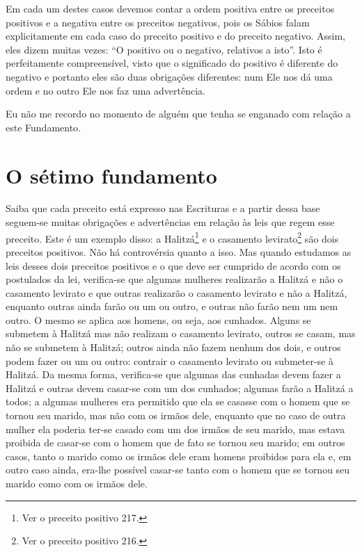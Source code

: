 Em cada um destes casos devemos contar a ordem positiva entre os
preceitos positivos e a negativa entre os preceitos negativos, pois os
Sábios falam explicitamente em cada caso do preceito positivo e do preceito
negativo. Assim, eles dizem muitas vezes: ``O positivo ou o negativo,
relativos a isto''. Isto é perfeitamente compreensível, visto que o
significado do positivo é diferente do negativo e portanto eles são
duas obrigações diferentes: num Ele nos dá uma ordem e no outro Ele nos
faz uma advertência.

Eu não me recordo no momento de alguém que tenha se enganado com relação
a este Fundamento.

\chapter*{O sétimo fundamento}

Saiba que cada preceito está expresso nas Escrituras e a partir dessa
base seguem-se muitas obrigações e advertências em relação às leis que
regem esse preceito. Este é um exemplo disso: a
Halitzá\footnote{Ver o preceito positivo 217.} e o casamento
levirato\footnote{Ver o preceito positivo 216.} são dois preceitos positivos. Não há
controvérsia quanto a isso. Mas quando estudamos as leis desses dois
preceitos positivos e o que deve ser cumprido de acordo com os
postulados da lei, verifica-se que algumas mulheres realizarão a
Halitzá e não o casamento levirato e que outras realizarão o
casamento levirato e não a Halitzá, enquanto outras ainda farão ou
um ou outro, e outras não farão nem um nem outro. O mesmo se aplica aos
homens, ou seja, aos cunhados. Alguns se submetem à Halitzá mas não
realizam o casamento levirato, outros se casam, mas não se submetem à
Halitzá; outros ainda não fazem nenhum dos dois, e outros podem
fazer ou um ou outro: contrair o casamento levirato ou submeter-se à
Halitzá. Da mesma forma, verifica-se que algumas das cunhadas devem
fazer a Halitzá e outras devem casar-se com um dos cunhados; algumas
farão a Halitzá a todos; a algumas mulheres era permitido que ela se
casasse com o homem que se tornou seu marido, mas não com os irmãos
dele, enquanto que no caso de outra mulher ela poderia ter-se casado com
um dos irmãos de seu marido, mas estava proibida de casar-se com o homem
que de fato se tornou seu marido; em outros casos, tanto o marido como
os irmãos dele eram homens proibidos para ela e, em outro caso ainda,
era-lhe possível casar-se tanto com o homem que se tornou seu marido
como com os irmãos dele.

